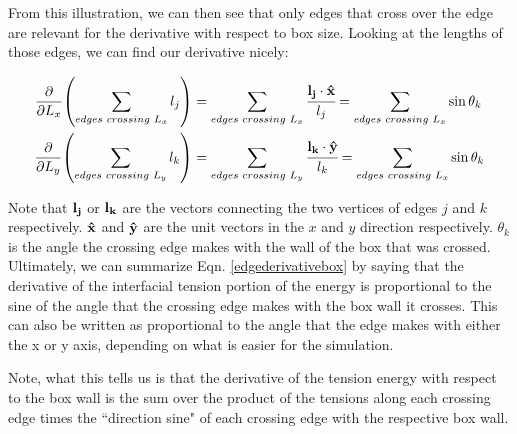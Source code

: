 \documentclass[12pt]{article}
\begin{document}
From this illustration, we can then see that only edges that cross over the edge are relevant for the derivative with respect to box size. Looking at the lengths of those edges, we can find our derivative nicely:
\begin{center}
\begin{equation}
\label{edgederivativebox}
\begin{split}
\pdv{L_x} (\sum\limits_{edges\hspace{1mm}crossing\hspace{1mm}L_x} l_j) &= \sum\limits_{edges\hspace{1mm}crossing\hspace{1mm}L_x} \cfrac{ \vb{l_j} \cdot {\vu{x}} }{l_j} = \sum\limits_{edges\hspace{1mm}crossing\hspace{1mm}L_x} \sin\theta_k\\
\pdv{L_y} (\sum\limits_{edges\hspace{1mm}crossing\hspace{1mm}L_y} l_k) &= \sum\limits_{edges\hspace{1mm}crossing\hspace{1mm}L_y} \cfrac{ \vb{l_k} \cdot {\vu{y}} }{l_k} = \sum\limits_{edges\hspace{1mm}crossing\hspace{1mm}L_x} \sin\theta_k\\
\end{split}
\end{equation}
\end{center}
Note that $\vb{l_j}$ or $\vb{l_k}$ are the vectors connecting the two vertices of edges $j$ and $k$ respectively. $\vu{x}$ and $\vu{y}$ are the unit vectors in the $x$ and $y$ direction respectively. $\theta_k$ is the angle the crossing edge makes with the wall of the box that was crossed. Ultimately, we can summarize Eqn. \ref{edgederivativebox} by saying that the derivative of the interfacial tension portion of the energy is proportional to the sine of the angle that the crossing edge makes with the box wall it crosses. This can also be written as proportional to the angle that the edge makes with either the x or y axis, depending on what is easier for the simulation. 

Note, what this tells us is that the derivative of the tension energy with respect to the box wall is the sum over the product of the tensions along each crossing edge times the ``direction sine" of each crossing edge with the respective box wall.
\end{document}
